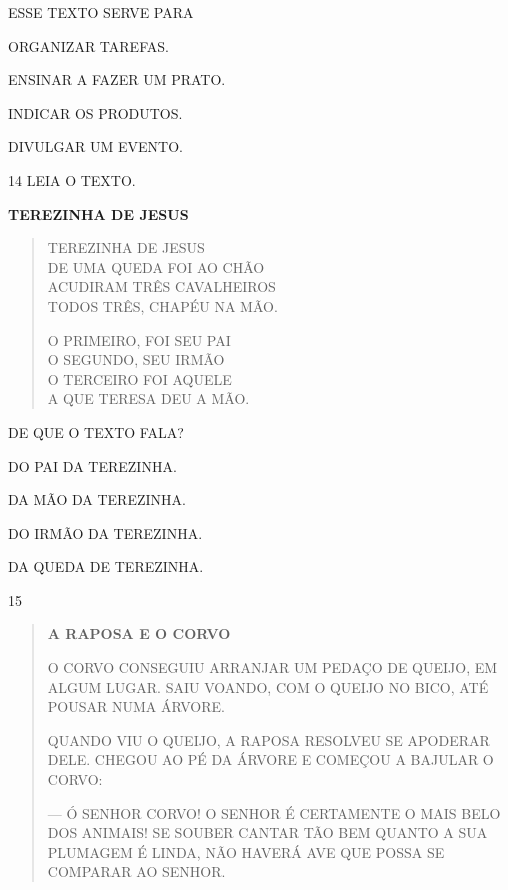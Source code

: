 ESSE TEXTO SERVE PARA

\begin{escolha}
\item ORGANIZAR TAREFAS.

\item ENSINAR A FAZER UM PRATO.

\item INDICAR OS PRODUTOS.

\item DIVULGAR UM EVENTO.
\end{escolha}

\num{14} LEIA O TEXTO.

\textbf{TEREZINHA DE JESUS}

\begin{verse}
TEREZINHA DE JESUS\\
DE UMA QUEDA FOI AO CHÃO\\
ACUDIRAM TRÊS CAVALHEIROS\\
TODOS TRÊS, CHAPÉU NA MÃO.

O PRIMEIRO, FOI SEU PAI\\
O SEGUNDO, SEU IRMÃO\\
O TERCEIRO FOI AQUELE\\
A QUE TERESA DEU A MÃO.
\end{verse}


DE QUE O TEXTO FALA?

\begin{escolha}
\item DO PAI DA TEREZINHA.

\item DA MÃO DA TEREZINHA.

\item DO IRMÃO DA TEREZINHA.

\item DA QUEDA DE TEREZINHA.
\end{escolha}

\num{15}

\begin{quote}
\textbf{A RAPOSA E O CORVO}

O CORVO CONSEGUIU ARRANJAR UM PEDAÇO DE QUEIJO, EM ALGUM
LUGAR. SAIU VOANDO, COM O QUEIJO NO BICO, ATÉ POUSAR NUMA
ÁRVORE.

QUANDO VIU O QUEIJO, A RAPOSA RESOLVEU SE APODERAR
DELE. CHEGOU AO PÉ DA ÁRVORE E COMEÇOU A BAJULAR O CORVO:

--- Ó SENHOR CORVO! O SENHOR É CERTAMENTE O MAIS BELO
DOS ANIMAIS! SE SOUBER CANTAR TÃO BEM QUANTO A SUA PLUMAGEM
É LINDA, NÃO HAVERÁ AVE QUE POSSA SE COMPARAR AO SENHOR.

\end{quote}

